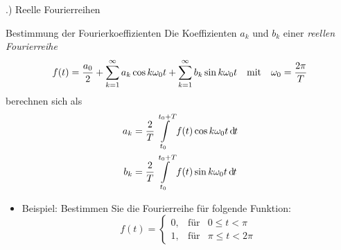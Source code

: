 \documentclass[t,14pt]{beamer}
\newcommand*\diff{\mathop{}\!\mathrm{d\hspace{-1pt}}}	%
\newcommand{\mitm}{\quad\textnormal{mit}\quad}
\begin{document}
\begin{frame}{\thesection .) Reelle Fourierreihen}
    \begin{alertblock}{Bestimmung der Fourierkoeffizienten}
        Die Koeffizienten $a_k$ und $b_k$ einer \emph{reellen Fourierreihe}
        \[
        f(t)=\frac{a_0}{2}+\suml_{k=1}^{\infty} a_k \cos k\omega_0 t +\suml_{k=1}^{\infty} b_k \sin k\omega_0 t \mitm \omega_0 =\frac{2\pi}{T}
        \]
        berechnen sich als
        \begin{align*}
            a_k &=\frac{2}{T}\intl_{t_0}^{t_0+T}f(t)\cos k\omega_0 t \diff t\\
            b_k &=\frac{2}{T}\intl_{t_0}^{t_0+T}f(t)\sin k\omega_0 t \diff t\\
        \end{align*}
    \end{alertblock}
    \begin{itemize}
        \item \alert{Beispiel:} Bestimmen Sie die Fourierreihe für folgende Funktion:
        \[
        f(t)=\left\{\begin{array}{lll}
            0,  &\text{für} & 0 \leq t < \pi \\
            1,  &\text{für} & \pi \leq t < 2\pi
        \end{array}     \right.
        \]
        \begin{center}
            \end{center}
    \end{itemize}
\end{frame}

\end{document}
